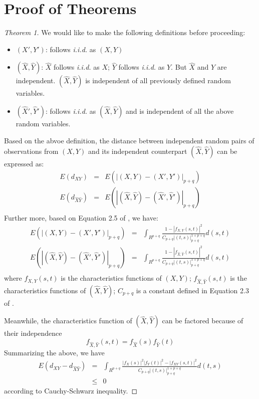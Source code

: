 \documentclass{article}
\newcommand{\iid}{\emph{i.i.d.}}
\begin{document}
\section{Proof of Theorems}
\label{sec:proof}

\begin{proof}[Theorem 1]
  We would like to make the following definitions before proceeding:
  \begin{itemize}
  \item $(X', Y')$: follows \emph{i.i.d.} as $(X,Y)$
  \item $(\hat{X},\hat{Y})$: $\hat{X}$ follows \iid{} as $X$;
    $\hat{Y}$ follows \iid{} as $Y$. But $\hat{X}$ and $\hat{Y}$ are
    independent. $(\hat{X},\hat{Y})$ is independent of all previously
    defined random variables.
  \item $(\hat{X}', \hat{Y}')$: follows \emph{i.i.d.} as
    $(\hat{X},\hat{Y})$ and is independent of all the above random
    variables.
  \end{itemize}
  Based on the abvoe definition, the distance between independent
  random pairs of observations from $(X,Y)$ and its independent
  counterpart $(\hat{X}, \hat{Y})$ can be expressed as: 
  \begin{eqnarray*}
    E(d_{XY}) & = & E(|(X,Y) - (X', Y')|_{p+q})\\
    E(d_{\hat{X}\hat{Y}}) & = & E(|(\hat{X},\hat{Y}) - (\hat{X}', \hat{Y}')|_{p+q})\\
  \end{eqnarray*}
  Further more, based on Equation 2.5 of \cite{székely2007}, we have:
  \begin{eqnarray*}
    E(|(X,Y) - (X',Y')|_{p+q}) &=& \int_{R^{p+q}}
    \frac{1-|f_{X,Y}(s,t)|^2}{C_{p+q}|(t,s)|_{p+q}^{1+p+q}} d(s,t)\\
    E(|(\hat{X},\hat{Y}) - (\hat{X}',\hat{Y}')|_{p+q}) &=& \int_{R^{p+q}}
    \frac{1-|f_{\hat{X},\hat{Y}}(s,t)|^2}{C_{p+q}|(t,s)|_{p+q}^{1+p+q}} d(s,t)\\
  \end{eqnarray*}
  where $f_{X,Y}(s,t)$ is the characteristics functions of $(X,Y)$;
  $f_{\hat{X},\hat{Y}}(s,t)$ is the characteristics functions of
  $(\hat{X},\hat{Y})$; $C_{p+q}$ is a constant defined in Equation 2.3
  of \cite{székely2007}.

  Meanwhile, the characteristics function of $(\hat{X}, \hat{Y})$ can
  be factored because of their independence
  \begin{displaymath}
    f_{\hat{X},\hat{Y}}(s,t) = f_{\hat{X}}(s) f_{\hat{Y}}(t) 
  \end{displaymath}
  Summarizing the above, we have 
  \begin{eqnarray*}
    E(d_{XY} - d_{\hat{X}\hat{Y}})& =& \int_{R^{p+q}} \frac{|f_X(s)|^2
      |f_Y(t)|^2 - |f_{XY}(s,t)|^2}{C_{p+q}|(t,s)|_{p+q}^{1+p+q}}
    d(t,s)\\
    &\le & 0 
  \end{eqnarray*}
  according to Cauchy-Schwarz inequality. 
\end{proof}



\end{document}
